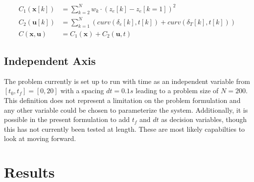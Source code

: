 \documentclass{article}
\begin{document}
\begin{align} 
	C_1(\mathbf{x}[k]) &= \sum_{k=2}^{N} w_k \cdot(z_e[k] - z_e[k=1])^2  \label{eq:altitude-cost}\\ 
	C_2(\mathbf{u}[k]) &= \sum_{k=1}^{N}{ \left(curv(\delta_e[k], t[k]) + curv(\delta_T[k], t[k]) \right) }\label{eq:curvature-cost}\\
	C(\mathbf{x},\mathbf{u}) &= C_1(\mathbf{x}) + C_2(\mathbf{u},t) \label{eq:total-cost}
	\end{align}


\subsection{Independent Axis} \label{sec:problem-grid}
The problem currently is set up to run with time as an independent variable from $[t_0, t_f] = [0,20]$ with a spacing $dt = 0.1s$ leading to a problem size of $N=200$.  
This definition does not represent a limitation on the problem formulation and any other variable could be chosen to parameterize the system. 
Additionally, it is possible in the present formulation to add $t_f$ and $dt$ as decision variables, though this has not currently been tested at length. 
These are most likely capabilties to look at moving forward.

\section{Results}
\end{document}

